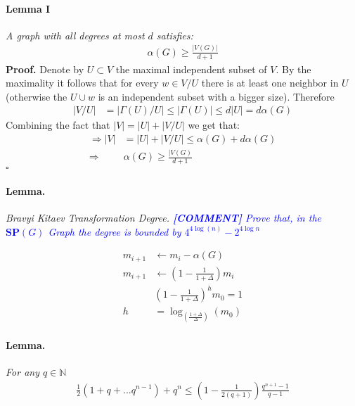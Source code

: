 \documentclass{article}
\newcommand{\commentt}[1]{\textcolor{blue}{ \textbf{[COMMENT]} #1}}
\newcommand{\ctt}[1]{\commentt{#1}}
\newcommand{\Lemma}{\paragraph{Lemma.}}
\begin{document}
\begin{multicols*}{2}
\paragraph{Lemma I} \textit{ A graph with all degrees at most \(d\) satisfies: 
\begin{equation*}
    \begin{split}
        \alpha \left( G\right) \ge \frac{|V\left(G\right)|}{d+1}
    \end{split}
\end{equation*}
}
\textbf{Proof.} Denote by \(U \subset V\) the maximal independent subset of \(V\). By the maximality it follows that for every \(w \in V/U \) there is at least one neighbor in \(U\) (otherwise the \(U \cup w\) is an independent subset with a bigger size). Therefore 
\begin{equation*}
    \begin{split}
        |V/U| &= |\Gamma\left(U\right) / U | \le |\Gamma\left(U\right)| \le d |U|= d \alpha \left( G\right) 
    \end{split}
\end{equation*}
Combining the fact that \(|V| = |U| + |V/U| \) we get that: 
\begin{equation*}
    \begin{split}
        \Rightarrow |V| &= |U| + |V/U| \le \alpha \left( G\right)  + d \alpha \left( G\right) \\
        \Rightarrow \  & \alpha \left( G\right) \ge \frac{|V\left(G\right)}{d+1} 
    \end{split}
\end{equation*}
\(\square\)

\Lemma \textit{Bravyi Kitaev Transformation Degree. \ctt{Prove that, in the \(\textbf{SP}(G)\) Graph the degree is bounded by \(4^{4\log(n)} - 2^{4\log{n}}\) }}


\begin{equation*}
    \begin{split}
        m_{i+1} & \leftarrow m_{i} - \alpha\left(G\right) \\ 
        m_{i+1} & \leftarrow \left( 1  - \frac{1}{1 + \Delta} \right)m_{i} \\ 
        & \left( 1  - \frac{1}{1 + \Delta} \right)^{h} m_{0} = 1 \\
        h &= \log_{\left( \frac{1 + \Delta}{\Delta} \right)}{\left( m_{0} \right)}
    \end{split}
\end{equation*}

\Lemma \textit{ For any \( q \in \mathbb{N}  \)    
\begin{equation*}
    \begin{split}
        \frac{1}{2}\left( 1 + q + ... q^{n-1} \right) + q^{n} \le \left( 1 - \frac{1}{2(q+1)} \right) \frac{q^{n+1}-1}{q-1} 
    \end{split}
\end{equation*}
}



\end{multicols*}
\end{document}
